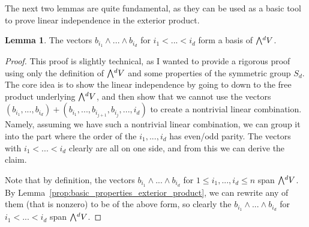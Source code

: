 \documentclass{scrartcl}
\newcommand{\extpow}{\mathchoice{{\textstyle\bigwedge}}
    {{\bigwedge}}
    {{\textstyle\wedge}}
    {{\scriptstyle\wedge}}}
\theoremstyle{definition}
\newtheorem{lemma}[subsection]{Lemma}
\begin{document}
The next two lemmas are quite fundamental, as they can be used as a basic tool to prove linear independence in the exterior product.
\begin{lemma}
    \label{prop:basis_product_independence}
    The vectors $b_{i_1} \wedge ... \wedge b_{i_d}$ for $i_1 < ... < i_d$ form a basis of $\extpow^d V$.
\end{lemma}
\begin{proof}
    This proof is slightly technical, as I wanted to provide a rigorous proof using only the definition of $\extpow^d V$ and some properties of the symmetric group $S_d$.
    The core idea is to show the linear independence by going to down to the free product underlying $\extpow^d V$, and then show that we cannot use the vectors $(b_{i_1}, ..., b_{i_d}) + (b_{i_1}, ..., b_{i_{j + 1}}, b_{i_j}, ..., i_d)$ to create a nontrivial linear combination.
    Namely, assuming we have such a nontrivial linear combination, we can group it into the part where the order of the $i_1, ..., i_d$ has even/odd parity.
    The vectors with $i_1 < ... < i_d$ clearly are all on one side, and from this we can derive the claim.

    Note that by definition, the vectors $b_{i_1} \wedge ... \wedge b_{i_d}$ for $1 \leq i_1, ..., i_d \leq n$ span $\extpow^d V$.
    By Lemma~\ref{prop:basic_properties_exterior_product}, we can rewrite any of them (that is nonzero) to be of the above form, so clearly the $b_{i_1} \wedge ... \wedge b_{i_d}$ for $i_1 < ... < i_d$ span $\extpow^d V$.


\end{proof}
\end{document}
